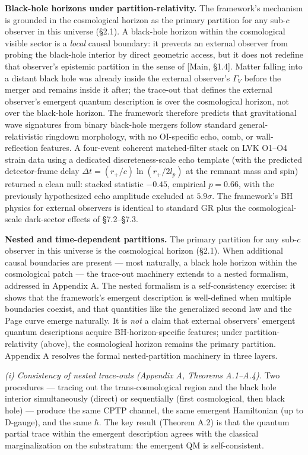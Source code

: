 \documentclass[
]{article}
\begin{document}
\textbf{Black-hole horizons under partition-relativity.} The framework's
mechanism is grounded in the cosmological horizon as the primary
partition for any sub-\(c\) observer in this universe (§2.1). A
black-hole horizon within the cosmological visible sector is a
\emph{local} causal boundary: it prevents an external observer from
probing the black-hole interior by direct geometric access, but it does
not redefine that observer's epistemic partition in the sense of
{[}Main, §1.4{]}. Matter falling into a distant black hole was already
inside the external observer's \(\Gamma_V\) before the merger and
remains inside it after; the trace-out that defines the external
observer's emergent quantum description is over the cosmological
horizon, not over the black-hole horizon. The framework therefore
predicts that gravitational wave signatures from binary black-hole
mergers follow standard general-relativistic ringdown morphology, with
no OI-specific echo, comb, or wall-reflection features. A four-event
coherent matched-filter stack on LVK O1--O4 strain data using a
dedicated discreteness-scale echo template (with the predicted
detector-frame delay \(\Delta t = (r_+/c)\ln(r_+/2 l_p)\) at the remnant
mass and spin) returned a clean null: stacked statistic \(-0.45\),
empirical \(p = 0.66\), with the previously hypothesized echo amplitude
excluded at \(5.9\sigma\). The framework's BH physics for external
observers is identical to standard GR plus the cosmological-scale
dark-sector effects of §7.2--§7.3.

\textbf{Nested and time-dependent partitions.} The primary partition for
any sub-\(c\) observer in this universe is the cosmological horizon
(§2.1). When additional causal boundaries are present --- most
naturally, a black hole horizon within the cosmological patch --- the
trace-out machinery extends to a nested formalism, addressed in Appendix
A. The nested formalism is a self-consistency exercise: it shows that
the framework's emergent description is well-defined when multiple
boundaries coexist, and that quantities like the generalized second law
and the Page curve emerge naturally. It is \emph{not} a claim that
external observers' emergent quantum descriptions acquire
BH-horizon-specific features; under partition-relativity (above), the
cosmological horizon remains the primary partition. Appendix A resolves
the formal nested-partition machinery in three layers.

\emph{(i) Consistency of nested trace-outs (Appendix A, Theorems
A.1--A.4).} Two procedures --- tracing out the trans-cosmological region
and the black hole interior simultaneously (direct) or sequentially
(first cosmological, then black hole) --- produce the same CPTP channel,
the same emergent Hamiltonian (up to D-gauge), and the same \(\hbar\).
The key result (Theorem A.2) is that the quantum partial trace within
the emergent description agrees with the classical marginalization on
the substratum: the emergent QM is self-consistent.
\end{document}
